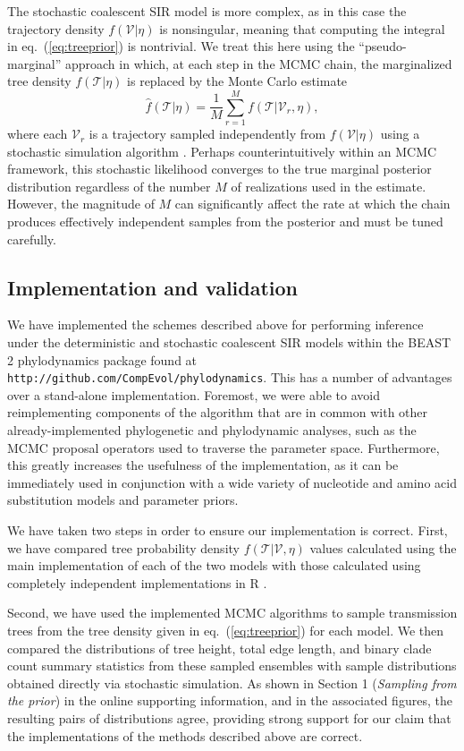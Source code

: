 \documentclass[12pt,titlepage]{article}
\newcommand{\traj}{\mathcal{V}}
\newcommand{\tree}{\mathcal{T}}
\begin{document}
The stochastic coalescent SIR model is more complex, as in this case
the trajectory density $f(\traj|\eta)$ is nonsingular, meaning that
computing the integral in eq.~(\ref{eq:treeprior}) is nontrivial. We
treat this here using the ``pseudo-marginal''
approach \citep{Beaumont:2003,Andrieu:2009} in which, at each step in
the MCMC chain, the marginalized tree density $f(\tree|\eta)$ is
replaced by the Monte Carlo estimate
\begin{equation}
\hat{f}(\tree|\eta)=\frac{1}{M}\sum_{r=1}^{M}f(\tree|\traj_r,\eta),
\end{equation}  
where each $\traj_r$ is a trajectory sampled independently from
$f(\traj|\eta)$ using a stochastic simulation algorithm
\citep{Sehl:2009aa}.  Perhaps counterintuitively within an MCMC framework, this stochastic likelihood
converges to the true marginal posterior distribution regardless of
the number $M$ of realizations used in the estimate.  However, the
magnitude of $M$ can significantly affect the rate at which the chain
produces effectively independent samples from the posterior and 
must be tuned carefully.


\subsection{Implementation and validation}

We have implemented the schemes described above for performing
inference under the deterministic and stochastic coalescent SIR
models within the BEAST 2 phylodynamics package found at \texttt{http://github.com/CompEvol/phylodynamics}. 
This has a number of advantages over a
stand-alone implementation. Foremost, we were able to
avoid reimplementing components of the algorithm that are in common
with other already-implemented phylogenetic and phylodynamic analyses,
such as the MCMC proposal operators used to traverse the parameter
space.  Furthermore, this greatly increases the usefulness of the
implementation, as it can be immediately used in conjunction with a
wide variety of nucleotide and amino acid substitution models and
parameter priors.

We have taken two steps in order to ensure our implementation
is correct. First, we have compared tree probability density
$f(\tree|\traj, \eta)$ values calculated using the main implementation
of each of the two models with those calculated using completely
independent implementations in R \citep{R}.

Second, we have used the implemented MCMC algorithms to sample
transmission trees from the tree density given in
eq.~(\ref{eq:treeprior}) for each model. We then compared the
distributions of tree height, total edge length, and binary clade count
summary statistics from these sampled ensembles with sample
distributions obtained directly via
stochastic simulation.  As shown in Section 1 (\textit{Sampling from the prior}) 
in the online supporting information, and in the associated figures, the resulting pairs of
distributions agree, providing strong support for our claim that the
implementations of the methods described above are correct.
\end{document}
